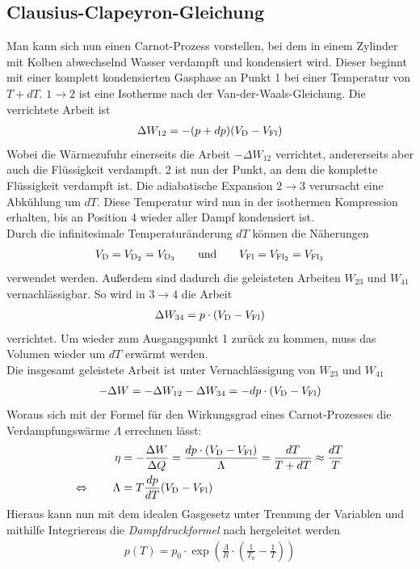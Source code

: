 \documentclass[12pt,a4paper,titlepage,headinclude,bibtotoc]{scrartcl}
\begin{document}
\subsection{Clausius-Clapeyron-Gleichung}
Man kann sich nun einen Carnot-Prozess vorstellen, bei dem in einem Zylinder mit Kolben abwechselnd Wasser verdampft und kondensiert wird.
Dieser beginnt mit einer komplett kondensierten Gasphase an Punkt 1 bei einer Temperatur von $T+dT$.
$1\rightarrow 2$ ist eine Isotherme nach der Van-der-Waals-Gleichung.
Die verrichtete Arbeit ist%
\begin{align*}
	\Delta W_{12}=-(p+dp)(V_\text D-V_\text{Fl})
\end{align*}
Wobei die Wärmezufuhr einerseits die Arbeit $-\Delta W_{12}$ verrichtet, andererseits aber auch die Flüssigkeit verdampft.
2 ist nun der Punkt, an dem die komplette Flüssigkeit verdampft ist.
Die adiabatische Expansion $2\rightarrow 3$ verursacht eine Abkühlung um $dT$.
Diese Temperatur wird nun in der isothermen Kompression erhalten, bis an Position 4 wieder aller Dampf kondensiert ist.\\
Durch die infinitesimale Temperaturänderung $dT$ können die Näherungen
\begin{align*}
	V_\text D = V_{\text{D}_2}= V_{\text{D}_3}\qquad\text{und}\qquad V_\text{Fl}=V_{\text{Fl}_2}=V_{\text{Fl}_3}
\end{align*}
verwendet werden.
Außerdem sind dadurch die geleisteten Arbeiten $W_{23}$ und $W_{41}$ vernachlässigbar.
So wird in $3\rightarrow 4$ die Arbeit
\begin{align*}
	\Delta W_{34}=p\cdot (V_\text D-V_\text{Fl})
\end{align*}
verrichtet.
Um wieder zum Ausgangspunkt 1 zurück zu kommen, muss das Volumen wieder um $dT$ erwärmt werden.\\
Die insgesamt geleistete Arbeit ist unter Vernachlässigung von $W_{23}$ und $W_{41}$
\begin{align*}
	-\Delta W=-\Delta W_{12}-\Delta W_{34}=-dp\cdot (V_\text D -V_\text{Fl})
\end{align*}
Woraus sich mit der Formel für den Wirkungsgrad eines Carnot-Prozesses die Verdampfungswärme $\Lambda$ errechnen lässt:
\begin{align*}
	\eta&=-\frac{\Delta W}{\Delta Q}=\frac{dp\cdot (V_\text D-V_\text{Fl})}{\Lambda}=\frac{dT}{T+dT}\approx \frac{dT}{T}\\
	\Leftrightarrow\qquad \Lambda&=T\frac{dp}{dT}(V_\text D-V_\text{Fl})
\end{align*}
Hieraus kann nun mit dem idealen Gasgesetz unter Trennung der Variablen und mithilfe Integrierens die \emph{Dampfdruckformel} nach \cite[S. 342, Formel (10.127)]{demtroeder} hergeleitet werden
\begin{align}
	p(T)=p_0\cdot \exp\left( \frac{\Lambda}{R}\cdot\left( \frac{1}{T_0}-\frac{1}{T} \right)\right)
	\label{eq:Dampfdruck}
\end{align}
\end{document}
